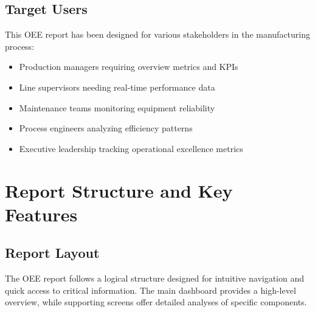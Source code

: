 \documentclass[11pt,a4paper]{article}
\begin{document}
\subsection{Target Users}
This OEE report has been designed for various stakeholders in the manufacturing process:

\begin{itemize}
    \item Production managers requiring overview metrics and KPIs
    \item Line supervisors needing real-time performance data
    \item Maintenance teams monitoring equipment reliability
    \item Process engineers analyzing efficiency patterns
    \item Executive leadership tracking operational excellence metrics
\end{itemize}

\section{Report Structure and Key Features}

\subsection{Report Layout}

The OEE report follows a logical structure designed for intuitive navigation and quick access to critical information. The main dashboard provides a high-level overview, while supporting screens offer detailed analyses of specific components.
\end{document}
